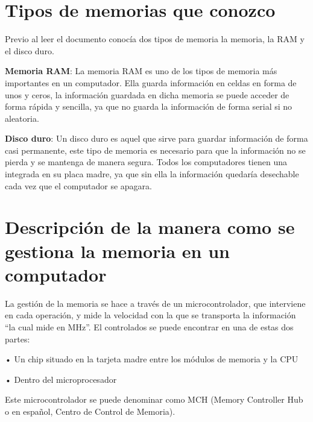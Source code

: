 \documentclass{article}
\begin{document}
\section{Tipos de memorias que conozco} \label{contenido}
        \vspace{0.5cm}
Previo al leer el documento conocía dos tipos de memoria la memoria, la RAM y el disco duro.
        \vspace{0.5cm}
        
\textbf{Memoria RAM}: La memoria RAM es uno de los tipos de memoria más importantes en un computador. Ella guarda información en celdas en forma de unos y ceros, la información guardada en dicha memoria se puede acceder de forma rápida y sencilla, ya que no guarda la información de forma serial si no aleatoria.\cite{sistema}
        \vspace{0.5cm} 
        
\textbf{Disco duro}: Un disco duro es aquel que sirve para guardar información de forma casi permanente, este tipo de memoria es necesario para que la información no se pierda y se mantenga de manera segura. Todos los computadores tienen una integrada en su placa madre, ya que sin ella la información quedaría desechable cada vez que el computador se apagara. \cite{Disco_Duro}

\section{Descripción de la manera como se gestiona la memoria en un computador}
        \vspace{0.5cm}
La gestión de la memoria se hace a través de un microcontrolador, que interviene en cada operación, y mide la velocidad con la que se transporta la información “la cual mide en MHz”. El controlados se puede encontrar en una de estas dos partes:

        \vspace{0.5cm}
•	 Un chip situado en la tarjeta madre entre los módulos de memoria y la CPU

        \vspace{0.2cm}
•	Dentro del microprocesador 

        \vspace{0.5cm}
Este microcontrolador se puede denominar como MCH (Memory Controller Hub o en español, Centro de Control de Memoria).
\end{document}

